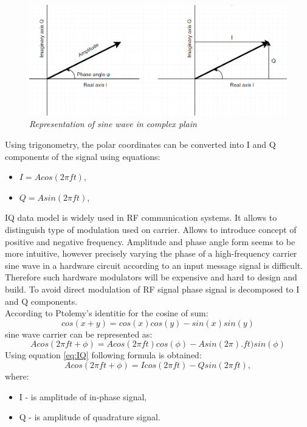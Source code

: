 \documentclass[en,printmode]{mgr}
\begin{document}
		\begin{figure}[!htb]
    		\centering
   			\includegraphics[width=\textwidth]{plots/polarplots.png}
    		\caption{\textit{Representation of sine wave in complex plain}}
    		\label{fig:polarplot}
		\end{figure}
		
		\newpage
		Using trigonometry, the polar coordinates can be converted into I and Q components of the signal using
		equations:
		\begin{itemize}
			\item $I = A cos\left(2\pi f t\right)$, \label{eq:IQ}
			\item $Q = A sin\left(2\pi f t\right)$,
		\end{itemize}
		
		IQ data model is widely used in RF communication systems. It allows to distinguish type of modulation used 
		on carrier. Allows to introduce concept of positive and negative frequency. Amplitude and phase angle form
		seems to be more intuitive, however precisely varying the phase of a high-frequency carrier sine wave in a
		hardware circuit according to an input message signal is difficult. Therefore such hardware modulators will
		be expensive and hard to design and build. To avoid direct modulation of RF signal phase signal is decomposed
		to I and Q components.
		\\
		
		According to Ptolemy’s identitie for the cosine of sum:
		\[
			cos\left(x+y\right) = 
			cos\left(x\right)  cos\left(y\right) - sin\left(x\right) sin\left(y\right)
		\] 
		sine wave carrier can be represented as:
		\[
			Acos\left(2\pi ft + \phi\right) = 
			Acos\left(2\pi ft\right)cos\left(\phi\right) - Asin\left(2\pi\right). ft)sin(\phi)
		\]
		Using equation \ref{eq:IQ} following formula is obtained:
		\[
			Acos\left(2\pi ft + \phi\right) = 
			I cos\left(2\pi f t\right) - Q sin\left(2\pi f t\right),
		\]
		where:
		\begin{itemize}
			\item I - is amplitude of in-phase signal,
			\item Q - is amplitude of quadrature signal.
		\end{itemize}
		
\end{document}
